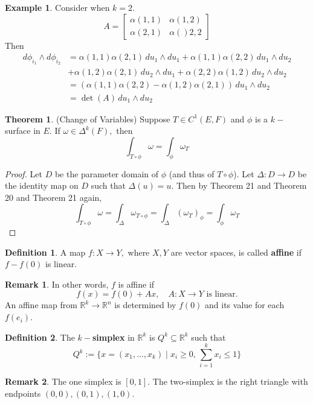 \documentclass[10pt, oneside]{article}
\newcommand{\bbR}{\mathbb{R}}
\theoremstyle{definition}
\newtheorem{exmp}{Example}[section]
\newtheorem{thm}{Theorem}
\newtheorem{defn}{Definition}
\newtheorem{rem}{Remark}
\begin{document}
\begin{exmp}
    Consider when $k = 2.$
\[ A = \begin{bmatrix}
     \alpha(1,1) & \alpha(1,2)\\
     \alpha(2,1) & \alpha()2,2
 \end{bmatrix}\]
 Then 
 \begin{align*}
 d\phi_{i_1}\wedge d\phi_{i_2} &= \alpha(1,1)\alpha(2,1)\, du_{1}\wedge du_{1} + \alpha(1,1)\alpha(2,2)\,du_{1}\wedge du_{2} \\
 &+ \alpha(1,2)\alpha(2,1)\,du_2 \wedge du_1 + \alpha(2,2)\alpha(1,2)\,du_2\wedge du_2\\
 &= (\alpha(1,1)\alpha(2,2) - \alpha(1,2)\alpha(2,1))\,du_1\wedge du_{2}\\
 &= \det(A)\,du_1 \wedge du_2
 \end{align*}
 
\end{exmp}

\begin{thm} (Change of Variables)
    Suppose $T\in C^1(E,F)$ and $\phi$ is a $k-$surface in $E.$ If $\omega\in \Delta^k(F),$ then 
    \[\int_{T\circ \phi} \omega = \int_\phi \omega_T\]
\end{thm}
\begin{proof}
    Let $D$ be the parameter domain of $\phi$ (and thus of $T\circ \phi$).  Let $\Delta: D \to D$ be the identity map on $D$ such that $\Delta(u) = u.$ Then by Theorem 21 and Theorem 20 and Theorem 21 again,
    \[\int_{T\circ \phi} \omega = \int_\Delta \omega_{T\circ \phi} = \int_\Delta (\omega_T)_\phi  = \int_\phi \omega_T\]
\end{proof}

\begin{defn}
    A map $f: X\to Y,$ where $X,Y$ are vector spaces, is called \textbf{affine} if $f - f(0)$ is linear.
\end{defn}
\begin{rem}
    In other words, $f$ is affine if 
    \[f(x) = f(0) + Ax,\quad A:X\to Y \text{ is linear}.\] An affine map from $\bbR^k \to \bbR^n$ is determined by $f(0)$ and its value for each $f(e_i).$
\end{rem}

\begin{defn}
    The \textbf{$k-$simplex} in $\bbR^k$ is $Q^k \subseteq \bbR^k$ such that 
    \[Q^k:= \{x = (x_1, \dots, x_k)\mid x_i \geq 0, \,\sum_{i=1}^k x_i \leq 1\}\]
\end{defn}
\begin{rem}
    The one simplex is $[0,1].$ The two-simplex is the right triangle with endpoints $(0,0), (0,1), (1,0).$ 
\end{rem}
\end{document}
